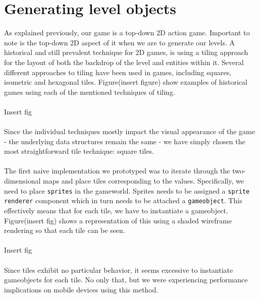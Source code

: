 \section{Generating level objects}
As explained previously, our game is a top-down 2D action game. Important to
note is the top-down 2D aspect of it when we are to generate our levels.
A historical and still prevalent technique for 2D games, is using a
tiling approach for the layout of both the backdrop of the level and entities
within it. Several different approaches to tiling have been used in games,
including squares, isometric and hexagonal tiles. Figure(insert figure)
show examples of historical games using each of the mentioned techniques of
tiling.
\\
\\
Insert fig
\\
\\
Since the individual techniques mostly impact the visual appearance of the game
- the underlying data structures remain the same - we have simply chosen the
most straightforward tile technique: square tiles.
\\
\\
The first naive implementation we prototyped was to iterate through the
two-dimensional maps and place tiles corresponding to the values. Specifically,
we need to place \texttt{sprites} in the gameworld. Sprites needs to be
assigned a \texttt{sprite renderer} component which in turn needs to be
attached a \texttt{gameobject}. This effectively means that for each tile, we
have to instantiate a gameobject. Figure(insert fig) shows a representation of
this using a shaded wireframe rendering so that each tile can be seen.
\\
\\
Insert fig
\\
\\
Since tiles exhibit no particular behavior, it seems excessive to instantiate
gameobjects for each tile. No only that, but we were experiencing performance
implications on mobile devices using this method.
